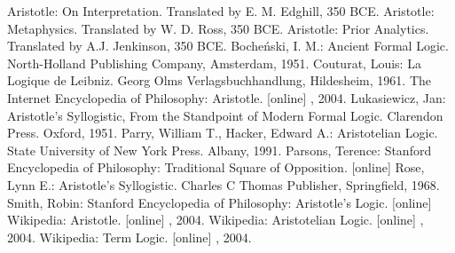 \documentclass[12pt]{article}
\begin{document}
\begin{thebibliography}{99}
 Aristotle: On Interpretation. Translated by E. M. Edghill, 350 BCE.
 Aristotle: Metaphysics. Translated by W. D. Ross, 350 BCE.
 Aristotle: Prior Analytics. Translated by A.J. Jenkinson, 350 BCE.
 Boche\'nski, I. M.: Ancient Formal Logic. North-Holland Publishing Company, Amsterdam, 1951.
 Couturat, Louis: La Logique de Leibniz.  Georg Olms Verlagsbuchhandlung, Hildesheim, 1961.
 The Internet Encyclopedia of Philosophy: Aristotle. [online]  , 2004.
 Lukasiewicz, Jan: Aristotle's Syllogistic, From the Standpoint of Modern Formal Logic. Clarendon Press. Oxford, 1951.
 Parry, William T., Hacker, Edward A.: Aristotelian Logic.  State University of New York Press. Albany, 1991.
 Parsons, Terence: Stanford Encyclopedia of Philosophy: Traditional Square of Opposition. [online] 
 Rose, Lynn E.: Aristotle's Syllogistic.  Charles C Thomas Publisher, Springfield, 1968. 
 Smith, Robin: Stanford Encyclopedia of Philosophy:  Aristotle's Logic. [online] 
 Wikipedia: Aristotle. [online]  , 2004.
 Wikipedia: Aristotelian Logic. [online]  , 2004.
 Wikipedia: Term Logic. [online]  , 2004.
\end{thebibliography}
\end{document}
